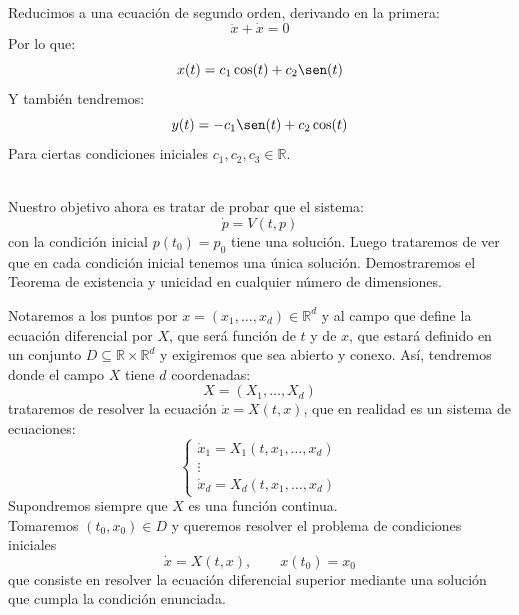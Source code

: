 \begin{ejemplo}
\begin{itemize}
            Reducimos a una ecuación de segundo orden, derivando en la primera:
            \begin{equation*}
                \ddot{x} + \dot{x} = 0
            \end{equation*}
            Por lo que:
            \begin{equation*}
                x(t) = c_1\cos(t) + c_2\sen(t)
            \end{equation*}
            Y también tendremos:
            \begin{equation*}
                y(t) = -c_1\sen(t) + c_2\cos(t)
            \end{equation*}
            Para ciertas condiciones iniciales $c_1,c_2,c_3\in \mathbb{R}$.
    \end{itemize}
\end{ejemplo}~\\

\noindent
Nuestro objetivo ahora es tratar de probar que el sistema:
\begin{equation*}
    \dot{p} = V(t,p)
\end{equation*}
con la condición inicial $p(t_0) = p_0$ tiene una solución. Luego trataremos de ver que en cada condición inicial tenemos una única solución. Demostraremos el Teorema de existencia y unicidad en cualquier número de dimensiones.

\begin{notacion}
    Notaremos a los puntos por $x=(x_1,\ldots,x_d)\in \mathbb{R}^d$ y al campo que define la ecuación diferencial por $X$, que será función de $t$ y de $x$, que estará definido en un conjunto $D\subseteq \mathbb{R}\times \mathbb{R}^d$ y exigiremos que sea abierto y conexo. Así, tendremos
    donde el campo $X$ tiene $d$ coordenadas:
    \begin{equation*}
        X = (X_1, \ldots, X_d)
    \end{equation*}
    trataremos de resolver la ecuación $\dot{x} = X(t,x)$, que en realidad es un sistema de ecuaciones:
    \begin{equation*}
        \left\{\begin{array}{l}
                \dot{x}_1 = X_1(t,x_1,\ldots,x_d) \\
                \vdots \\
                \dot{x}_d = X_d(t,x_1,\ldots,x_d) 
        \end{array}\right.
    \end{equation*}
    Supondremos siempre que $X$ es una función continua.\\

    \noindent
    Tomaremos $(t_0,x_0) \in D$ y queremos resolver el problema de condiciones iniciales
    \begin{equation*}
        \dot{x} = X(t,x), \qquad x(t_0) = x_0
    \end{equation*}
    que consiste en resolver la ecuación diferencial superior mediante una solución que cumpla la condición enunciada.
\end{notacion}~\\

